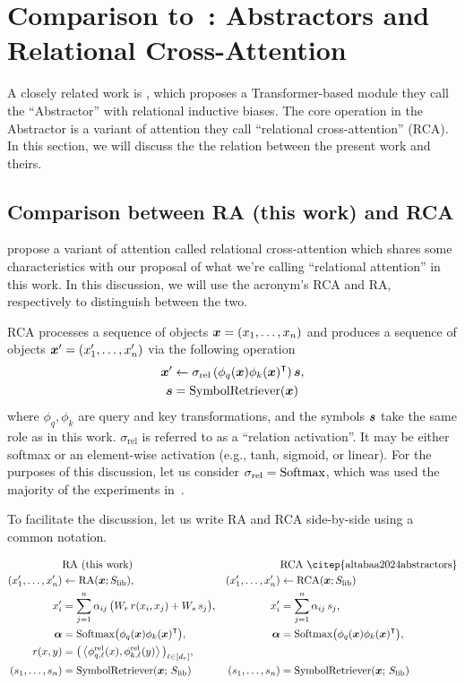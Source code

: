 \section{Comparison to~\citet{altabaa2024abstractors}: Abstractors and Relational Cross-Attention}\label{sec:appdx_abstrator}

A closely related work is \citet{altabaa2024abstractors}, which proposes a Transformer-based module they call the ``Abstractor'' with relational inductive biases. The core operation in the Abstractor is a variant of attention they call ``relational cross-attention'' (RCA). In this section, we will discuss the the relation between the present work and theirs.

\subsection{Comparison between RA (this work) and RCA \citep{altabaa2024abstractors}}

\citet{altabaa2024abstractors} propose a variant of attention called relational cross-attention which shares some characteristics with our proposal of what we're calling ``relational attention'' in this work. In this discussion, we will use the acronym's RCA and RA, respectively to distinguish between the two.

RCA processes a sequence of objects $\bm{x} = (x_1, \ldots, x_n)$ and produces a sequence of objects $\bm{x}' = (x_1', \ldots, x_n')$ via the following operation
\begin{align*}
    \bm{x}' &\gets \sigma_{\mathrm{rel}}\left(\phi_q(\bm{x}) {\phi_k(\bm{x})}^\intercal\right) \bm{s}, \\
    \bm{s} &= \mathrm{SymbolRetriever}(\bm{x})
\end{align*}
where $\phi_q, \phi_k$ are query and key transformations, and the symbols $\bm{s}$ take the same role as in this work. $\sigma_{\mathrm{rel}}$ is referred to as a ``relation activation''. It may be either softmax or an element-wise activation (e.g., tanh, sigmoid, or linear). For the purposes of this discussion, let us consider $\sigma_{\mathrm{rel}} = \mathrm{Softmax}$, which was used the majority of the experiments in~\citep{altabaa2024abstractors}.

To facilitate the discussion, let us write RA and RCA side-by-side using a common notation.

\begin{align*}
&\text{RA (this work)}    & &\text{RCA \citep{altabaa2024abstractors}}\\
(x_1', \ldots, x_n') &\gets \RA(\x; \Slib), & (x_1', \ldots, x_n') &\gets \RCA(\x; \Slib)\\
x_i' &= \sum_{j=1}^{n} \alpha_{ij} \, \bigparen{W_r \, r(x_i, x_j) + W_s \, s_j}, & x_i' &= \sum_{j=1}^{n} \alpha_{ij} \, s_j,\\
\bm{\alpha} &= \Softmax\bigparen{\phi_q(\x) {\phi_k(\x)}^\intercal}, & \bm{\alpha} &= \Softmax\bigparen{\phi_q(\x) {\phi_k(\x)}^\intercal},\\
r(x, y) &= \bigparen{\iprod{\phi_{q,\ell}^{\rel}(x)}{\phi_{k,\ell}^{\rel}(y)}}_{\ell \in [d_r]}, & \\
(s_1, \ldots, s_n) &= \SymbolRetriever(\x;\,\Slib) & (s_1, \ldots, s_n) &= \SymbolRetriever(\x;\,\Slib)
\end{align*}

